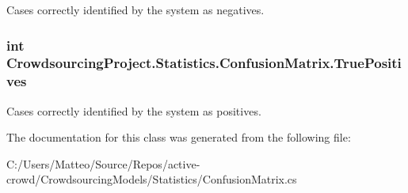 Cases correctly identified by the system as negatives. 

\hypertarget{class_crowdsourcing_project_1_1_statistics_1_1_confusion_matrix_ae1776127573af2d851e6102bb71acc30}{}
\subsubsection[{True\+Positives}]{\setlength{\rightskip}{0pt plus 5cm}int Crowdsourcing\+Project.\+Statistics.\+Confusion\+Matrix.\+True\+Positives\hspace{0.3cm}{\ttfamily [get]}}\label{class_crowdsourcing_project_1_1_statistics_1_1_confusion_matrix_ae1776127573af2d851e6102bb71acc30}


Cases correctly identified by the system as positives. 



The documentation for this class was generated from the following file\+:\begin{DoxyCompactItemize}
\item 
C\+:/\+Users/\+Matteo/\+Source/\+Repos/active-\/crowd/\+Crowdsourcing\+Models/\+Statistics/Confusion\+Matrix.\+cs\end{DoxyCompactItemize}
